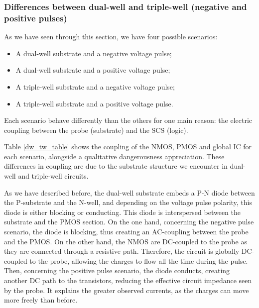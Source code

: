 	\subsubsection{Differences between dual-well and triple-well (negative and positive pulses)}
		As we have seen through this section, we have four possible scenarios:
		\begin{itemize}
			\item A dual-well substrate and a negative voltage pulse;
			\item A dual-well substrate and a positive voltage pulse;
			\item A triple-well substrate and a negative voltage pulse;
			\item A triple-well substrate and a positive voltage pulse.
		\end{itemize}
		Each scenario behave differently than the others for one main reason: the electric coupling between the probe (substrate) and the SCS (logic).
		
		Table \ref{dw_tw_table} shows the coupling of the NMOS, PMOS and global IC for each scenario, alongside a qualitative dangerousness appreciation.
		These differences in coupling are due to the substrate structure we encounter in dual-well and triple-well circuits.

		As we have described before, the dual-well substrate embeds a P-N diode between the P-substrate and the N-well, and depending on the voltage pulse polarity, this diode is either blocking or conducting.
		This diode is interspersed between the substrate and the PMOS section.
		On the one hand, concerning the negative pulse scenario, the diode is blocking, thus creating an AC-coupling between the probe and the PMOS.
		On the other hand, the NMOS are DC-coupled to the probe as they are connected through a resistive path.
		Therefore, the circuit is globally DC-coupled to the probe, allowing the charges to flow all the time during the pulse.
		Then, concerning the positive pulse scenario, the diode conducts, creating another DC path to the transistors, reducing the effective circuit impedance seen by the probe.
		It explains the greater observed currents, as the charges can move more freely than before.
